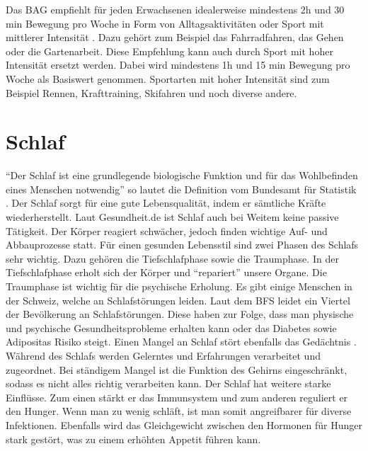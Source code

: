 \newline
Das BAG empfiehlt für jeden Erwachsenen idealerweise mindestens 2h und 30 min Bewegung pro Woche in Form von Alltagsaktivitäten oder Sport mit mittlerer Intensität \cite{bewegungsfoerderung}. Dazu gehört zum Beispiel das Fahrradfahren, das Gehen oder die Gartenarbeit. Diese Empfehlung kann auch durch Sport mit hoher Intensität ersetzt werden. Dabei wird mindestens 1h und 15 min Bewegung pro Woche als Basiswert genommen. Sportarten mit hoher Intensität sind zum Beispiel Rennen, Krafttraining, Skifahren und noch diverse andere. 
\section{Schlaf}
\authortoc{\bastian}{\sectionident}
“Der Schlaf ist eine grundlegende biologische Funktion und für das Wohlbefinden eines Menschen notwendig” so lautet die Definition vom Bundesamt für Statistik \cite{bundesamtfrstatistik_2015_schlafstoerungen}.
\newline
Der Schlaf sorgt für eine gute Lebensqualität, indem er sämtliche Kräfte wiederherstellt. Laut Gesundheit.de ist Schlaf auch bei Weitem keine passive Tätigkeit. Der Körper reagiert schwächer, jedoch finden wichtige Auf- und Abbauprozesse statt. Für einen gesunden Lebensstil sind zwei Phasen des Schlafs sehr wichtig. Dazu gehören die Tiefschlafphase sowie die Traumphase. In der Tiefschlafphase erholt sich der Körper und “repariert” unsere Organe. Die Traumphase ist wichtig für die psychische Erholung. Es gibt einige Menschen in der Schweiz, welche an Schlafstörungen leiden. Laut dem BFS leidet ein Viertel der Bevölkerung an Schlafstörungen. Diese haben zur Folge, dass man physische und psychische Gesundheitsprobleme erhalten kann oder das Diabetes sowie Adipositas Risiko steigt. Einen Mangel an Schlaf stört ebenfalls das Gedächtnis \cite{schlaf-grundbeduerfnis-und-lebenselixier}. Während des Schlafs werden Gelerntes und Erfahrungen verarbeitet und zugeordnet. Bei ständigem Mangel ist die Funktion des Gehirns eingeschränkt, sodass es nicht alles richtig verarbeiten kann. Der Schlaf hat weitere starke Einflüsse. Zum einen stärkt er das Immunsystem und zum anderen reguliert er den Hunger. Wenn man zu wenig schläft, ist man somit angreifbarer für diverse Infektionen. Ebenfalls wird das Gleichgewicht zwischen den Hormonen für Hunger stark gestört, was zu einem erhöhten Appetit führen kann.
